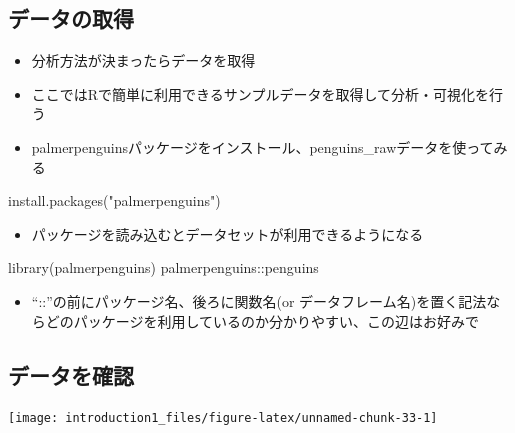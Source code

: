 \documentclass[
]{ltjsarticle}
\newenvironment{Shaded}{\begin{snugshade}}{\end{snugshade}}
\newcommand{\FunctionTok}[1]{\textcolor[rgb]{0.00,0.00,0.00}{#1}}
\newcommand{\NormalTok}[1]{#1}
\newcommand{\SpecialCharTok}[1]{\textcolor[rgb]{0.00,0.00,0.00}{#1}}
\newcommand{\StringTok}[1]{\textcolor[rgb]{0.31,0.60,0.02}{#1}}
\providecommand{\tightlist}{%
  \setlength{\itemsep}{0pt}\setlength{\parskip}{0pt}}
\begin{document}
\hypertarget{ux30c7ux30fcux30bfux306eux53d6ux5f97}{%
\subsection{データの取得}\label{ux30c7ux30fcux30bfux306eux53d6ux5f97}}

\begin{itemize}
\tightlist
\item
  分析方法が決まったらデータを取得
\item
  ここではRで簡単に利用できるサンプルデータを取得して分析・可視化を行う
\item
  palmerpenguinsパッケージをインストール、penguins\_rawデータを使ってみる
\end{itemize}

\begin{Shaded}
\begin{Highlighting}[]
\FunctionTok{install.packages}\NormalTok{(}\StringTok{"palmerpenguins"}\NormalTok{)}
\end{Highlighting}
\end{Shaded}

\begin{itemize}
\tightlist
\item
  パッケージを読み込むとデータセットが利用できるようになる
\end{itemize}

\begin{Shaded}
\begin{Highlighting}[]
\FunctionTok{library}\NormalTok{(palmerpenguins)}
\NormalTok{palmerpenguins}\SpecialCharTok{::}\NormalTok{penguins}
\end{Highlighting}
\end{Shaded}

\begin{itemize}
\tightlist
\item
  ``::''の前にパッケージ名、後ろに関数名(or
  データフレーム名)を置く記法ならどのパッケージを利用しているのか分かりやすい、この辺はお好みで
\end{itemize}

\hypertarget{ux30c7ux30fcux30bfux3092ux78baux8a8d}{%
\subsection{データを確認}\label{ux30c7ux30fcux30bfux3092ux78baux8a8d}}

\texttt{[image: introduction1\_files/figure-latex/unnamed-chunk-33-1]}
\end{document}
